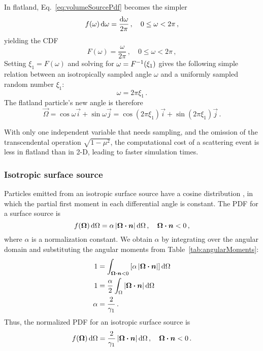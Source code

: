 In flatland, Eq.~\eqref{eq:volumeSourcePdf} becomes the simpler
\begin{equation*}
  f(\omega) \mathop{}\!\mathrm{d}\omega = \frac{\mathop{}\!\mathrm{d}\omega}{2\pi} \,,
  \quad 0 \le \omega < 2\pi\,,
\end{equation*}
yielding the CDF
\begin{equation}\label{eq:volumeSourceFlatland}
  F(\omega) = \frac{\omega}{2\pi}\,,
  \quad 0 \le \omega < 2\pi\,,
\end{equation}
Setting $\xi_1 = F(\omega)$ and solving for $\omega = F^{-1}(\xi_1)$ gives the
following simple relation between an isotropically sampled angle $\omega$ and a
uniformly sampled random number $\xi_1$:
\begin{equation*}
  \omega = 2\pi \xi_1\,.
\end{equation*}
The flatland particle's new angle is therefore
\begin{equation*}
  \vec{\Omega} = \cos \omega \vec{i} + \sin \omega \vec{j}
  = \cos(2\pi\xi_1) \vec{i} + \sin(2\pi\xi_1) \vec{j}\,.
\end{equation*}

With only one independent variable that needs sampling, and the omission of
the transcendental operation $\sqrt{1-\mu^2}$, the computational cost of a
scattering event is less in flatland than in 2-D, leading to
faster simulation times.

\subsubsection{Isotropic surface source}\label{sec:isoSurface}
Particles emitted from an isotropic surface source have a cosine distribution
\cite{Gre2002}, in which the partial first moment in each differential angle is
constant. The PDF for a surface source is
\begin{equation*}
  f(\bm{\Omega}) \mathop{}\!\mathrm{d}\Omega = \alpha \left| \bm{\Omega}\bm{\cdot} \bm{n} \right| \mathop{}\!\mathrm{d}\Omega \,,
\quad \bm{\Omega}\bm{\cdot} \bm{n} < 0 \,,
\end{equation*}
where $\alpha$ is a normalization constant. We obtain $\alpha$ by integrating over
the angular domain and substituting the angular moments from Table~\ref{tab:angularMoments}:
\begin{align*}
  1 &= \int_{\bm{\Omega}\bm{\cdot} \bm{n} < 0} \left[ \alpha \left| \bm{\Omega}\bm{\cdot}
  \bm{n} \right| \right] \mathop{}\!\mathrm{d}\Omega
  \\
  1 &=\frac{\alpha}{2} \int_{\Omega} \left| \bm{\Omega}\bm{\cdot} \bm{n} \right| \mathop{}\!\mathrm{d}\Omega
  \\
  \alpha &= \frac{2}{\gamma_1}\,.
\end{align*}
Thus, the normalized PDF for an isotropic surface source is
\begin{equation}\label{eq:surfaceSourcePdf}
  f(\bm{\Omega}) \mathop{}\!\mathrm{d}\Omega = \frac{2}{\gamma_1} \left| \bm{\Omega}\bm{\cdot} \bm{n} \right| \mathop{}\!\mathrm{d}\Omega \,,
\quad \bm{\Omega}\bm{\cdot} \bm{n} < 0 \,.
\end{equation}

